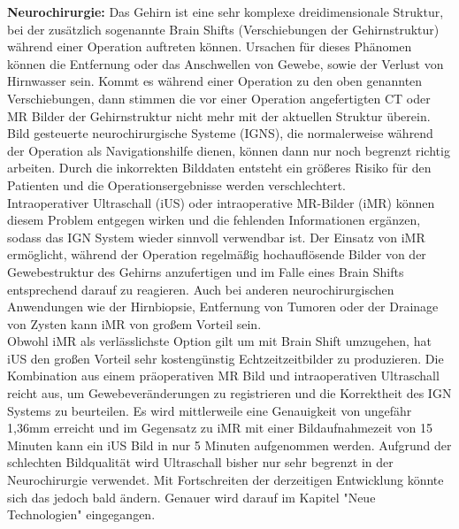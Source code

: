 \textbf{Neurochirurgie:}
Das Gehirn ist eine sehr komplexe dreidimensionale Struktur, bei der zusätzlich sogenannte Brain Shifts (Verschiebungen der Gehirnstruktur) während einer Operation auftreten können. Ursachen für dieses Phänomen können die Entfernung oder das Anschwellen von Gewebe, sowie der Verlust von Hirnwasser sein. 
Kommt es während einer Operation zu den oben genannten Verschiebungen, dann stimmen die vor einer Operation angefertigten CT oder MR Bilder der Gehirnstruktur nicht mehr mit der aktuellen Struktur überein. Bild gesteuerte neurochirurgische Systeme (IGNS), die normalerweise während der Operation als Navigationshilfe dienen, können dann nur noch begrenzt richtig arbeiten. Durch die inkorrekten Bilddaten entsteht ein größeres Risiko für den Patienten und die Operationsergebnisse werden verschlechtert.\\
Intraoperativer Ultraschall (iUS) oder intraoperative MR-Bilder (iMR) können diesem Problem entgegen wirken und die fehlenden Informationen ergänzen, sodass das IGN System wieder sinnvoll verwendbar ist.
Der Einsatz von iMR ermöglicht, während der Operation regelmäßig hochauflösende Bilder von der Gewebestruktur des Gehirns anzufertigen und im Falle eines Brain Shifts entsprechend darauf zu reagieren. Auch bei anderen neurochirurgischen Anwendungen wie der Hirnbiopsie, Entfernung von Tumoren oder der Drainage von Zysten kann iMR von großem Vorteil sein.\\
Obwohl iMR als verlässlichste Option gilt um mit Brain Shift umzugehen, hat iUS den großen Vorteil sehr kostengünstig Echtzeitzeitbilder zu produzieren. Die Kombination aus einem präoperativen MR Bild und intraoperativen Ultraschall reicht aus, um Gewebeveränderungen zu registrieren und die Korrektheit des IGN Systems zu beurteilen. Es wird mittlerweile eine Genauigkeit von ungefähr 1,36mm erreicht und im Gegensatz zu iMR mit einer Bildaufnahmezeit von 15 Minuten kann ein iUS Bild in nur 5 Minuten aufgenommen werden.
Aufgrund der schlechten Bildqualität wird Ultraschall bisher nur sehr begrenzt in der Neurochirurgie verwendet. Mit Fortschreiten der derzeitigen Entwicklung könnte sich das jedoch bald ändern. Genauer wird darauf im Kapitel "Neue Technologien" eingegangen. \cite{BrainShiftInTumorResection}

